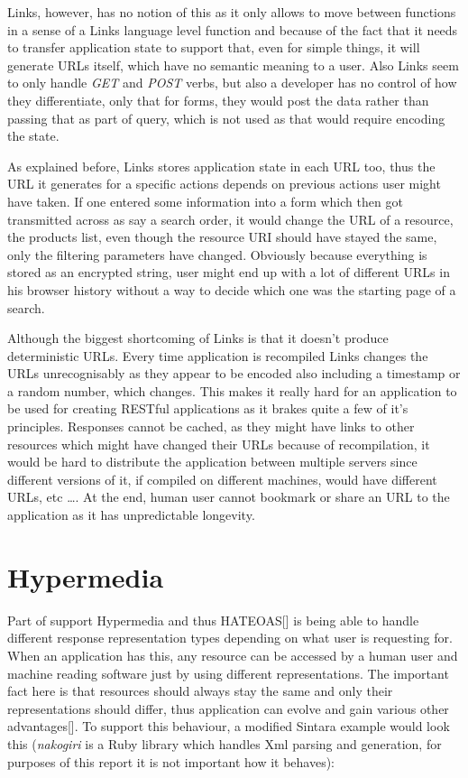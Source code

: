 Links, however, has no notion of this as it only allows to move between functions in a sense of a Links language level function and because of the fact that it needs to transfer application state to support that, even for simple things, it will generate URLs itself, which have no semantic meaning to a user. Also Links seem to only handle \textit{GET} and \textit{POST} verbs, but also a developer has no control of how they differentiate, only that for forms, they would post the data rather than passing that as part of query, which is not used as that would require encoding the state.

As explained before, Links stores application state in each URL too, thus the URL it generates for a specific actions depends on previous actions user might have taken. If one entered some information into a form which then got transmitted across as say a search order, it would change the URL of a resource, the products list, even though the resource URI should have stayed the same, only the filtering parameters have changed. Obviously because everything is stored as an encrypted string, user might end up with a lot of different URLs in his browser history without a way to decide which one was the starting page of a search.

Although the biggest shortcoming of Links is that it doesn't produce deterministic URLs. Every time application is recompiled Links changes the URLs unrecognisably as they appear to be encoded also including a timestamp or a random number, which changes. This makes it really hard for an application to be used for creating RESTful applications as it brakes quite a few of it's principles. Responses cannot be cached, as they might have links to other resources which might have changed their URLs because of recompilation, it would be hard to distribute the application between multiple servers since different versions of it, if compiled on different machines, would have different URLs, etc \ldots. At the end, human user cannot bookmark or share an URL to the application as it has unpredictable longevity. 

\section{Hypermedia}

Part of support Hypermedia and thus HATEOAS[] is being able to handle different response representation types depending on what user is requesting for. When an application has this, any resource can be accessed by a human user and machine reading software just by using different representations. The important fact here is that resources should always stay the same and only their representations should differ, thus application can evolve and gain various other advantages[]. To support this behaviour, a modified Sintara example would look this (\textit{nakogiri} is a Ruby library which handles Xml parsing and generation, for purposes of this report it is not important how it behaves):

